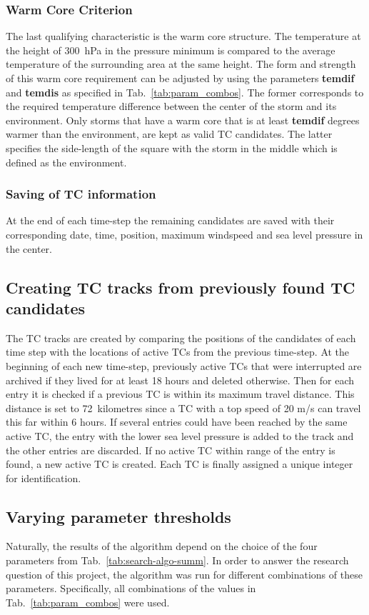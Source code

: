 \subsubsection*{Warm Core Criterion}
The last qualifying characteristic is the warm core structure. The temperature
at the height of 300~hPa in the pressure minimum is compared to the average
temperature of the surrounding area at the same height. The form and strength
of this warm core requirement can be adjusted by using the parameters
\textbf{temdif} and \textbf{temdis} as specified in Tab.~\ref{tab:param_combos}. The former corresponds to the required
temperature difference between the center of the storm and its environment.
Only storms that have a warm core that is at least \textbf{temdif} degrees
warmer than the environment, are kept as valid TC candidates. The latter
specifies the side-length of the square with the storm in the middle which is
defined as the environment.

\subsubsection*{Saving of TC information}
At the end of each time-step the remaining candidates are saved with their
corresponding date, time, position, maximum windspeed and sea level pressure in
the center.

\subsection{Creating TC tracks from previously found TC candidates}
The TC tracks are created by comparing the positions of the candidates of each time step with the locations of active TCs from the previous time-step. At the beginning of each new time-step, previously active TCs that were interrupted are archived if they lived for at
least 18 hours and deleted otherwise. Then for each entry it is checked if a
previous TC is within its maximum travel distance. This distance is set to
72~kilometres since a TC with a top speed of 20 m/s can travel this far within
6 hours. If several entries could have been reached by the same active TC, the
entry with the lower sea level pressure is added to the track and the other
entries are discarded. If no active TC within range of the entry is found, a new
active TC is created. Each TC is finally assigned a unique integer for
identification.

\subsection{Varying parameter thresholds}
Naturally, the results of the algorithm depend on the choice of the four
parameters from Tab.~\ref{tab:search-algo-summ}. In order to answer the
research question of this project, the algorithm was run for different
combinations of these parameters. Specifically, all combinations of the values
in Tab.~\ref{tab:param_combos} were used.

